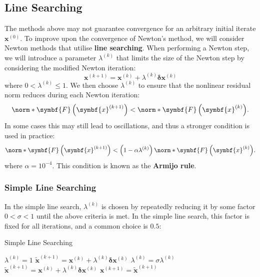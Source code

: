 \documentclass{article}
\begin{document}
\subsection{Line Searching}
The methods above may not guarantee convergence for an arbitrary
initial iterate \(\symbf{x}^{\left( 0 \right)}\). To improve upon the
convergence of Newton's method, we will consider Newton methods that
utilise \textbf{line searching}. When performing a Newton step, we will
introduce a parameter \(\lambda^{\left( k \right)}\) that limits the
size of the Newton step by considering the modified Newton iteration:
\begin{equation*}
    \symbf{x}^{\left( k+1 \right)} = \symbf{x}^{\left( k \right)} + \lambda^{\left( k \right)} \symbf{\delta}{\symbf{x}}^{\left( k \right)}
\end{equation*}
where \(0 < \lambda^{\left( k \right)} \leqslant 1\). We then choose
\(\lambda^{\left( k \right)}\) to ensure that the nonlinear residual
norm reduces during each Newton iteration:
\begin{equation*}
    \norm*{\symbf{F}\left( \symbf{x}^{\left( k+1 \right)} \right)} < \norm*{\symbf{F}\left( \symbf{x}^{\left( k \right)} \right)}.
\end{equation*}
In some cases this may still lead to oscillations, and thus a stronger
condition is used in practice:
\begin{equation*}
    \norm*{\symbf{F}\left( \symbf{x}^{\left( k+1 \right)} \right)} < \left( 1 - \alpha \lambda^{\left( k \right)} \right) \norm*{\symbf{F}\left( \symbf{x}^{\left( k \right)} \right)}.
\end{equation*}
where \(\alpha = 10^{-4}\). This condition is known as the \textbf{Armijo rule}.
\subsubsection{Simple Line Searching}
In the simple line search, \(\lambda^{\left( k \right)}\) is chosen by
repeatedly reducing it by some factor \(0 < \sigma < 1\) until the
above criteria is met. In the simple line search, this factor is fixed
for all iterations, and a common choice is \(0.5\):
\begin{algorithm}[H]
    \caption{Simple Line Searching}
    \begin{algorithmic}
        \State \(\lambda^{\left( k \right)} = 1\)
        \State \(\tilde{\symbf{x}}^{\left( k + 1 \right)} = \symbf{x}^{\left( k \right)} + \lambda^{\left( k \right)} \symbf{\delta} \symbf{x}^{\left( k \right)}\) 
        \State \(\lambda^{\left( k \right)} = \sigma \lambda^{\left( k \right)}\)
        \State \(\tilde{\symbf{x}}^{\left( k+1 \right)} = \symbf{x}^{\left( k \right)} + \lambda^{\left( k \right)} \symbf{\delta}{\symbf{x}}^{\left( k \right)}\)
        \EndWhile
        \State \(\symbf{x}^{\left( k+1 \right)} = \tilde{\symbf{x}}^{\left( k+1 \right)}\)
    \end{algorithmic}
\end{algorithm}
\end{document}
